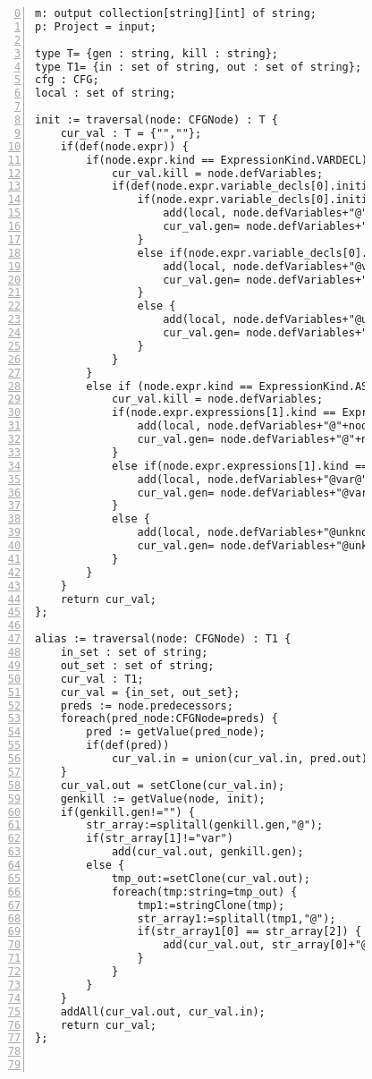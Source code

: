 \begin{figure}[ht!]
\begin{lstlisting}[numbers=left, tabsize=4, caption={Local must not alias},label={lst:lmna-code},firstline=0, firstnumber=0, lastline = 42] 
m: output collection[string][int] of string;
p: Project = input;

type T= {gen : string, kill : string};
type T1= {in : set of string, out : set of string};
cfg : CFG;
local : set of string;

init := traversal(node: CFGNode) : T {
	cur_val : T = {"",""};
	if(def(node.expr)) {
		if(node.expr.kind == ExpressionKind.VARDECL) {
			cur_val.kill = node.defVariables;
			if(def(node.expr.variable_decls[0].initializer)) {
				if(node.expr.variable_decls[0].initializer.kind == ExpressionKind.NEW) {
					add(local, node.defVariables+"@"+node.expr.variable_decls[0].initializer.new_type.qualified_name);
					cur_val.gen= node.defVariables+"@"+node.expr.variable_decls[0].initializer.new_type.qualified_name;
				}
				else if(node.expr.variable_decls[0].initializer.kind == ExpressionKind.VARACCESS) {
					add(local, node.defVariables+"@var@"+node.expr.variable_decls[0].initializer.variable);
					cur_val.gen= node.defVariables+"@var@"+node.expr.variable_decls[0].initializer.variable;
				}
				else {
					add(local, node.defVariables+"@unknown");
					cur_val.gen= node.defVariables+"@unknown";
				}
			}
		}
		else if (node.expr.kind == ExpressionKind.ASSIGN) {
			cur_val.kill = node.defVariables;
			if(node.expr.expressions[1].kind == ExpressionKind.NEW) {
				add(local, node.defVariables+"@"+node.expr.expressions[1].new_type.qualified_name);
				cur_val.gen= node.defVariables+"@"+node.expr.expressions[1].new_type.qualified_name;
			}
			else if(node.expr.expressions[1].kind == ExpressionKind.VARACCESS) {
				add(local, node.defVariables+"@var@"+node.expr.expressions[1].variable);
				cur_val.gen= node.defVariables+"@var@"+node.expr.expressions[1].variable;
			}
			else {
				add(local, node.defVariables+"@unknown");
				cur_val.gen= node.defVariables+"@unknown";
			}
		}
	}
	return cur_val;
};

alias := traversal(node: CFGNode) : T1 {
	in_set : set of string;
	out_set : set of string;
	cur_val : T1;
	cur_val = {in_set, out_set};
	preds := node.predecessors;
	foreach(pred_node:CFGNode=preds) {	
		pred := getValue(pred_node);
		if(def(pred))
			cur_val.in = union(cur_val.in, pred.out);
	}
	cur_val.out = setClone(cur_val.in);
	genkill := getValue(node, init);
	if(genkill.gen!="") {
		str_array:=splitall(genkill.gen,"@");
		if(str_array[1]!="var")
			add(cur_val.out, genkill.gen);
		else {
			tmp_out:=setClone(cur_val.out);
			foreach(tmp:string=tmp_out) {
				tmp1:=stringClone(tmp);
				str_array1:=splitall(tmp1,"@");
				if(str_array1[0] == str_array[2]) {
					add(cur_val.out, str_array[0]+"@"+str_array1[1]);
				}
			}
		}
	}
	addAll(cur_val.out, cur_val.in);
	return cur_val;
};



\end{lstlisting}
\end{figure}
